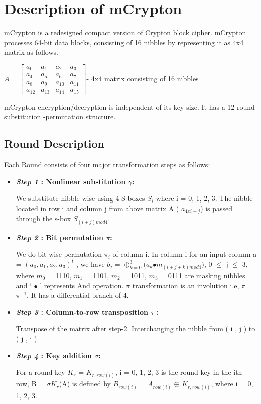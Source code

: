 \documentclass{transcrypto}
\begin{document}
	\section{Description of mCrypton}
	 mCrypton is a redesigned compact version of Crypton block cipher. mCrypton processes 64-bit data blocks, consisting of 16 nibbles by representing it as 4x4 matrix as follows.\\
	 \begin{center}
	 	$A = \begin{bmatrix}
	 	a_{0} & a_{1} & a_{2} & a_{3}\\
	 	a_{4} & a_{5} & a_{6} & a_{7}\\
	 	a_{8} & a_{9} & a_{10} & a_{11}\\
	 	a_{12} & a_{13} & a_{14} & a_{15}
	 	
	 	\end{bmatrix}$-
	 	{4x4 matrix consisting of 16 nibbles}
	 \end{center}
 mCrypton encryption/decryption is independent of its key size. It has a 12-round substitution -permutation structure. 

	
	\subsection{Round Description}
	Each Round consists of four major transformation steps as follows:
	\begin{itemize}
		\item \textbf{\textit{Step 1} : Nonlinear substitution $\gamma$:}
		
		
		We substitute nibble-wise using 4 S-boxes $S_{i}$ where i = 0, 1, 2, 3. The nibble located in row i and column j from above matrix A ( $a_{4xi + j}$) is passed through the s-box $S_{(i + j)mod 4}$.
		
		\item \textbf{\textit{Step 2} :  Bit permutation $\pi$:}
		
		
		We do bit wise permutation $\pi_i$ of column i. In column i for an input column a = $( a_0, a_1, a_2, a_3 )^t$ , we have $b_j$ = $\oplus_{k = 0}^3(a_{k}$$\bullet$$m_{(i+j+k)mod 4})$, 0 $\leq$ j $\leq$ 3, where $m_{0}$ = 1110, $m_{1}$ = 1101, $m_{2}$ = 1011, $m_{3}$ = 0111 are masking nibbles and ‘ $\bullet$ ’ represents And operation. $\pi$ transformation is an involution i.e, $\pi$ = $\pi^{-1}$. It has a differential branch of 4.
		\item \textbf{\textit{Step 3} :  Column-to-row transposition $\tau$
			:}
		
		Transpose of the matrix after step-2. Interchanging the nibble from ( i , j ) to ( j , i ).
		
		\item \textbf{\textit{Step 4} : Key addition $\sigma$:}
		
		For a round key $K_r$ = $K_{r,row(i)}$, i = 0, 1, 2, 3 is the round key in the ith row, B = $\sigma K_{r}$(A) is defined by $B_{row(i)}$ = $A_{row(i)}$ $\oplus$ $K_{r,row(i)}$, where i = 0, 1, 2, 3.
		
	\end{itemize}
	
\end{document}
